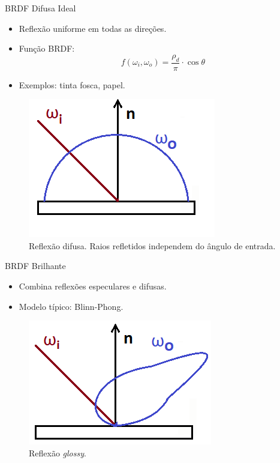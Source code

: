\begin{frame}{BRDF Difusa Ideal}
    \begin{itemize}
        \item Reflexão uniforme em todas as direções.
        \item Função BRDF:
        \[
        f(\omega_i, \omega_o) = \frac{\rho_d}{\pi} \cdot \cos \theta
        \]
        \item Exemplos: tinta fosca, papel.
    \end{itemize}
    \begin{figure}[H]
        \centering
        \includegraphics[scale=0.5]{./Imagens/diffuse-2d.png}
        \caption{\small Reflexão difusa. Raios refletidos independem do ângulo de entrada.}
    \end{figure}
\end{frame}

\begin{frame}{BRDF Brilhante}
    \begin{itemize}
        \item Combina reflexões especulares e difusas.
        \item Modelo típico: Blinn-Phong.
    \end{itemize}
    \begin{figure}[H]
        \centering
        \includegraphics[scale=0.5]{./Imagens/glossy-2d.png}
        \caption{\small Reflexão \textit{glossy}.}
    \end{figure}
\end{frame}

